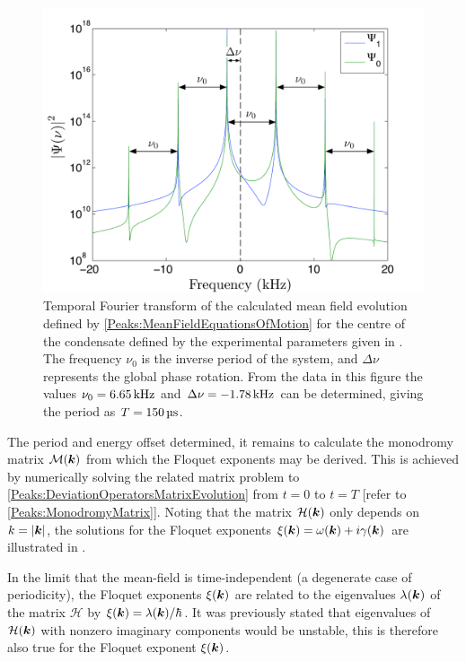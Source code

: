 \begin{figure}
    \centering
    \includegraphics[width=14cm]{MeanFieldFourierTransform}
    \caption{Temporal Fourier transform of the calculated mean field evolution defined by \eqref{Peaks:MeanFieldEquationsOfMotion} for the centre of the condensate defined by the experimental parameters given in . The frequency $\nu_0$ is the inverse period of the system, and $\Delta\nu$ represents the global phase rotation. From the data in this figure the values $\nu_0 = \unit[6.65]{kHz}$ and $\Delta\nu = \unit[-1.78]{kHz}$ can be determined, giving the period as $T=\unit[150]{\micro{}s}$. \label{Peaks:MeanFieldFourierTransform}}
\end{figure}

The period and energy offset determined, it remains to calculate the mono\-dromy matrix $\mathcal{M}(\bm{k})$ from which the Floquet exponents may be derived. This is achieved by numerically solving the related matrix problem to \eqref{Peaks:DeviationOperatorsMatrixEvolution} from $t=0$ to $t=T$ [refer to \eqref{Peaks:MonodromyMatrix}]. Noting that the matrix $\mathcal{H}(\bm{k})$ only depends on $k = \left|\bm{k}\right|$, the solutions for the Floquet exponents $\xi(\bm{k}) = \omega(\bm{k}) + i\gamma(\bm{k})$ are illustrated in .

In the limit that the mean-field is time-independent (a degenerate case of periodicity), the Floquet exponents $\xi(\bm{k})$ are related to the eigenvalues $\lambda(\bm{k})$ of the matrix $\mathcal{H}$ by $\xi(\bm{k}) = \lambda(\bm{k}) / \hbar$. It was previously stated that eigenvalues of $\mathcal{H}(\bm{k})$ with nonzero imaginary components would be unstable, this is therefore also true for the Floquet exponent $\xi(\bm{k})$.

